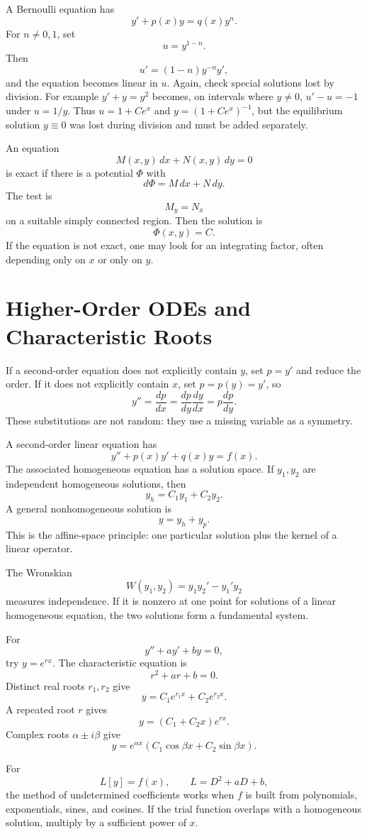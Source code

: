 A Bernoulli equation has
\[
  y'+p(x)y=q(x)y^n.
\]
For $n\ne0,1$, set
\[
  u=y^{1-n}.
\]
Then
\[
  u'=(1-n)y^{-n}y',
\]
and the equation becomes linear in $u$.  Again, check special solutions lost by division. For example \(y'+y=y^2\) becomes, on intervals where \(y\ne0\), \(u'-u=-1\) under \(u=1/y\). Thus \(u=1+Ce^x\) and \(y=(1+Ce^x)^{-1}\), but the equilibrium solution \(y\equiv0\) was lost during division and must be added separately.

An equation
\[
  M(x,y)\,dx+N(x,y)\,dy=0
\]
is exact if there is a potential $\Phi$ with
\[
  d\Phi=M\,dx+N\,dy.
\]
The test is
\[
  M_y=N_x
\]
on a suitable simply connected region.  Then the solution is
\[
  \Phi(x,y)=C.
\]
If the equation is not exact, one may look for an integrating factor, often depending only on $x$ or only on $y$.

\section{Higher-Order ODEs and Characteristic Roots}

If a second-order equation does not explicitly contain $y$, set $p=y'$ and reduce the order.  If it does not explicitly contain $x$, set $p=p(y)=y'$, so
\[
  y''=\frac{dp}{dx}=\frac{dp}{dy}\frac{dy}{dx}=p\frac{dp}{dy}.
\]
These substitutions are not random: they use a missing variable as a symmetry.

A second-order linear equation has
\[
  y''+p(x)y'+q(x)y=f(x).
\]
The associated homogeneous equation has a solution space.  If $y_1,y_2$ are independent homogeneous solutions, then
\[
  y_h=C_1y_1+C_2y_2.
\]
A general nonhomogeneous solution is
\[
  y=y_h+y_p.
\]
This is the affine-space principle: one particular solution plus the kernel of a linear operator.

The Wronskian
\[
  W(y_1,y_2)=y_1y_2'-y_1'y_2
\]
measures independence.  If it is nonzero at one point for solutions of a linear homogeneous equation, the two solutions form a fundamental system.

For
\[
  y''+ay'+by=0,
\]
try $y=e^{rx}$.  The characteristic equation is
\[
  r^2+ar+b=0.
\]
Distinct real roots $r_1,r_2$ give
\[
  y=C_1e^{r_1x}+C_2e^{r_2x}.
\]
A repeated root $r$ gives
\[
  y=(C_1+C_2x)e^{rx}.
\]
Complex roots $\alpha\pm i\beta$ give
\[
  y=e^{\alpha x}(C_1\cos\beta x+C_2\sin\beta x).
\]

For
\[
  L[y]=f(x),\qquad L=D^2+aD+b,
\]
the method of undetermined coefficients works when $f$ is built from polynomials, exponentials, sines, and cosines.  If the trial function overlaps with a homogeneous solution, multiply by a sufficient power of $x$.

